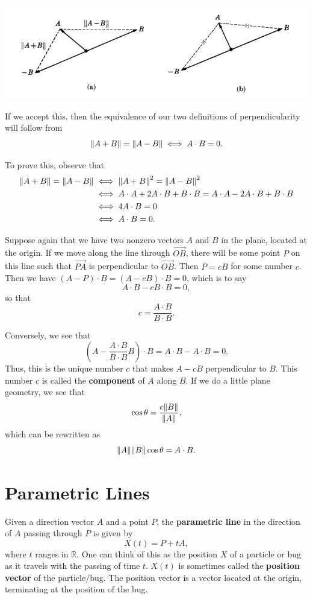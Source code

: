 \documentclass{article}
\begin{document}
\includegraphics[scale = 0.5]{perpendicular.PNG}

If we accept this, then the equivalence of our two definitions of perpendicularity will follow from 
\[\norm{A+B}=\norm{A-B} \iff A \cdot B = 0.\]

To prove this, observe that
\begin{align*}
    \norm{A+B}=\norm{A-B}&\iff \norm{A + B}^2 = \norm{A - B}^2\\
    &\iff A\cdot A + 2 A \cdot B + B \cdot B = A \cdot A - 2 A \cdot B + B \cdot B\\
    &\iff 4 A \cdot B = 0\\
    &\iff A \cdot B = 0.
\end{align*}

Suppose again that we have two nonzero vectors $A$ and $B$ in the plane, located at the origin.
If we move along the line through $\overrightarrow{OB}$, there will be some point $P$ on this line such
that $\overrightarrow{PA}$ is perpendicular to $\overrightarrow{OB}$. Then $P = c B$ for some number $c$.
Then we have $(A - P)\cdot B = (A - cB)\cdot B = 0$, which is to say
\[A \cdot B - c B \cdot B = 0,\]
so that
\[c = \frac{A \cdot B}{B \cdot B}.\]

Conversely, we see that
\[\left( A - \frac{A \cdot  B}{B \cdot B} B \right) \cdot B = A\cdot B - A \cdot B = 0.\]
Thus, this is the unique number $c$ that makes $A - cB$ perpendicular to $B$. This number $c$ is called
the \textbf{component} of $A$ along $B$. If we do a little plane geometry, we see that
\[\cos \theta = \frac{c \norm{B}}{\norm{A}},\]
which can be rewritten as 
\[\norm{A} \norm{B} \cos \theta = A \cdot B.\]

\section*{Parametric Lines}
Given a direction vector $A$ and a point $P$, the \textbf{parametric line}
in the direction of $A$ passing through $P$ is given by
\[X(t) = P + tA,\]
where $t$ ranges in $\mathbb{R}$. One can think of this as 
the position $X$ of a particle or bug as it travels with
the passing of time $t$. $X(t)$ is sometimes called the
\textbf{position vector} of the particle/bug. The position vector
is a vector located at the origin, terminating at the position of 
the bug. 

\end{document}
